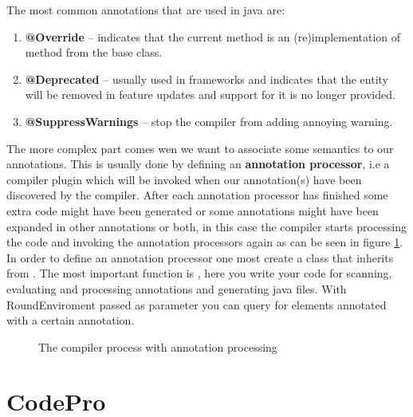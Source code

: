 	The most common annotations that are used in java are:
	\begin{enumerate}
	  \item \textbf{@Override} -- indicates that the current method is an
 (re)implementation of method from the base class.
  
	  \item \textbf{@Deprecated} -- usually used in frameworks and indicates that
	  the entity will be removed in feature updates and support for it is no longer
 provided.
 
	  \item \textbf{@SuppressWarnings} -- stop the compiler from adding annoying
 warning.
	\end{enumerate}	

	The more complex part comes wen we want to associate some semantics to our
annotations. This is usually done by defining an \textbf{annotation processor},
i.e a compiler plugin which will be invoked when our annotation(s) have been 
discovered by the compiler. After each annotation processor has finished some
extra code might have been generated or some annotations might have been
expanded in other annotations or both, in this case the compiler starts
processing the code and invoking the annotation processors again as can be
seen in figure \ref{fig:annProc}.
	 In order to define an annotation processor one most create a class that
inherits from . The
most important function is , here you write your code for scanning, evaluating 
and processing annotations and generating java files. With RoundEnviroment passed 
as parameter you can query for elements annotated with a certain annotation.
	
\begin{figure}
\centering
{}
\caption{The compiler process with annotation processing\label{fig:annProc}}
\end{figure}
		

\section{CodePro}



